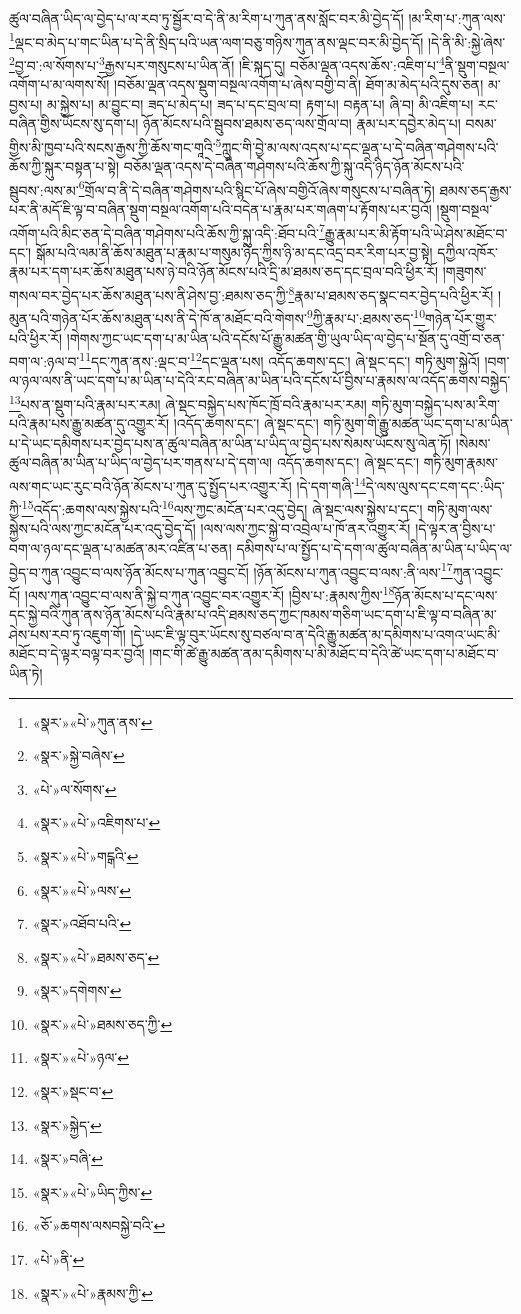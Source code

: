 ཚུལ་བཞིན་ཡིད་ལ་བྱེད་པ་ལ་རབ་ཏུ་སྦྱོར་བ་དེ་ནི་མ་རིག་པ་ཀུན་ནས་སློང་བར་མི་བྱེད་དོ། །མ་རིག་པ་:ཀུན་ལས་\footnote{«སྣར་»«པེ་»ཀུན་ནས་}ལྡང་བ་མེད་པ་གང་ཡིན་པ་དེ་ནི་སྲིད་པའི་ཡན་ལག་བཅུ་གཉིས་ཀུན་ནས་ལྡང་བར་མི་བྱེད་དོ། །དེ་ནི་མི་:སྐྱེ་ཞེས་\footnote{«སྣར་»སྐྱེ་བཞེས་}བྱ་བ་:ལ་སོགས་པ་\footnote{«པེ་»ལ་སོགས་}རྒྱས་པར་གསུངས་པ་ཡིན་ནོ། །ཇི་སྐད་དུ། བཅོམ་ལྡན་འདས་ཆོས་:འཇིག་པ་\footnote{«སྣར་»«པེ་»འཇིགས་པ་}ནི་སྡུག་བསྔལ་འགོག་པ་མ་ལགས་སོ། །བཅོམ་ལྡན་འདས་སྡུག་བསྔལ་འགོག་པ་ཞེས་བགྱི་བ་ནི། ཐོག་མ་མེད་པའི་དུས་ཅན། མ་བྱས་པ། མ་སྐྱེས་པ། མ་བྱུང་བ། ཟད་པ་མེད་པ། ཟད་པ་དང་བྲལ་བ། རྟག་པ། བརྟན་པ། ཞི་བ། མི་འཇིག་པ། རང་བཞིན་གྱིས་ཡོངས་སུ་དག་པ། ཉོན་མོངས་པའི་སྦུབས་ཐམས་ཅད་ལས་གྲོལ་བ། རྣམ་པར་དབྱེར་མེད་པ། བསམ་གྱིས་མི་ཁྱབ་པའི་སངས་རྒྱས་ཀྱི་ཆོས་གང་གཱའི་\footnote{«སྣར་»«པེ་»གངྒའི་}ཀླུང་གི་བྱེ་མ་ལས་འདས་པ་དང་ལྡན་པ་དེ་བཞིན་གཤེགས་པའི་ཆོས་ཀྱི་སྐུར་བསྟན་པ་སྟེ། བཅོམ་ལྡན་འདས་དེ་བཞིན་གཤེགས་པའི་ཆོས་ཀྱི་སྐུ་འདི་ཉིད་ཉོན་མོངས་པའི་སྦུབས་:ལས་མ་\footnote{«སྣར་»«པེ་»ལས་}གྲོལ་བ་ནི་དེ་བཞིན་གཤེགས་པའི་སྙིང་པོ་ཞེས་བགྱིའོ་ཞེས་གསུངས་པ་བཞིན་ཏེ། ཐམས་ཅད་རྒྱས་པར་ནི་མདོ་ཇི་ལྟ་བ་བཞིན་སྡུག་བསྔལ་འགོག་པའི་བདེན་པ་རྣམ་པར་གཞག་པ་རྟོགས་པར་བྱའོ། །སྡུག་བསྔལ་འགོག་པའི་མིང་ཅན་དེ་བཞིན་གཤེགས་པའི་ཆོས་ཀྱི་སྐུ་འདི་:ཐོབ་པའི་\footnote{«སྣར་»འཐོབ་པའི་}རྒྱུ་རྣམ་པར་མི་རྟོག་པའི་ཡེ་ཤེས་མཐོང་བ་དང་། སྒོམ་པའི་ལམ་ནི་ཆོས་མཐུན་པ་རྣམ་པ་གསུམ་ཉིད་ཀྱིས་ཉི་མ་དང་འདྲ་བར་རིག་པར་བྱ་སྟེ། དཀྱིལ་འཁོར་རྣམ་པར་དག་པར་ཆོས་མཐུན་པས་ཉེ་བའི་ཉོན་མོངས་པའི་དྲི་མ་ཐམས་ཅད་དང་བྲལ་བའི་ཕྱིར་རོ། །གཟུགས་གསལ་བར་བྱེད་པར་ཆོས་མཐུན་པས་ནི་ཤེས་བྱ་:ཐམས་ཅད་ཀྱི་\footnote{«སྣར་»«པེ་»ཐམས་ཅད་}རྣམ་པ་ཐམས་ཅད་སྣང་བར་བྱེད་པའི་ཕྱིར་རོ། །མུན་པའི་གཉེན་པོར་ཆོས་མཐུན་པས་ནི་དེ་ཁོ་ན་མཐོང་བའི་གེགས་\footnote{«སྣར་»དགེགས་}ཀྱི་རྣམ་པ་:ཐམས་ཅད་\footnote{«སྣར་»«པེ་»ཐམས་ཅད་ཀྱི་}གཉེན་པོར་གྱུར་པའི་ཕྱིར་རོ། །གེགས་ཀྱང་ཡང་དག་པ་མ་ཡིན་པའི་དངོས་པོ་རྒྱུ་མཚན་གྱི་ཡུལ་ཡིད་ལ་བྱེད་པ་སྔོན་དུ་འགྲོ་བ་ཅན་བག་ལ་:ཉལ་བ་\footnote{«སྣར་»«པེ་»ཉལ་}དང་ཀུན་ནས་:ལྡང་བ་\footnote{«སྣར་»སྡང་བ་}དང་ལྡན་པས། འདོད་ཆགས་དང་། ཞེ་སྡང་དང་། གཏི་མུག་སྐྱེའོ། །བག་ལ་ཉལ་ལས་ནི་ཡང་དག་པ་མ་ཡིན་པ་དེའི་རང་བཞིན་མ་ཡིན་པའི་དངོས་པོ་བྱིས་པ་རྣམས་ལ་འདོད་ཆགས་བསྐྱེད་\footnote{«སྣར་»སྐྱེད་}པས་ན་སྡུག་པའི་རྣམ་པར་རམ། ཞེ་སྡང་བསྐྱེད་པས་ཁོང་ཁྲོ་བའི་རྣམ་པར་རམ། གཏི་མུག་བསྐྱེད་པས་མ་རིག་པའི་རྣམ་པས་རྒྱུ་མཚན་དུ་འགྱུར་རོ། །འདོད་ཆགས་དང་། ཞེ་སྡང་དང་། གཏི་མུག་གི་རྒྱུ་མཚན་ཡང་དག་པ་མ་ཡིན་པ་དེ་ཡང་དམིགས་པར་བྱེད་པས་ན་ཚུལ་བཞིན་མ་ཡིན་པ་ཡིད་ལ་བྱེད་པས་སེམས་ཡོངས་སུ་ལེན་ཏོ། །སེམས་ཚུལ་བཞིན་མ་ཡིན་པ་ཡིད་ལ་བྱེད་པར་གནས་པ་དེ་དག་ལ། འདོད་ཆགས་དང་། ཞེ་སྡང་དང་། གཏི་མུག་རྣམས་ལས་གང་ཡང་རུང་བའི་ཉོན་མོངས་པ་ཀུན་དུ་སྤྱོད་པར་འགྱུར་རོ། །དེ་དག་གཞི་\footnote{«སྣར་»བཞི་}དེ་ལས་ལུས་དང་ངག་དང་:ཡིད་ཀྱི་\footnote{«སྣར་»«པེ་»ཡིད་ཀྱིས་}འདོད་:ཆགས་ལས་སྐྱེས་པའི་\footnote{«ཅོ་»ཆགས་ལསབསྐྱེ་བའི་}ལས་ཀྱང་མངོན་པར་འདུ་བྱེད། ཞེ་སྡང་ལས་སྐྱེས་པ་དང་། གཏི་མུག་ལས་སྐྱེས་པའི་ལས་ཀྱང་མངོན་པར་འདུ་བྱེད་དོ། །ལས་ལས་ཀྱང་སྐྱེ་བ་འབྲེལ་པ་ཁོ་ནར་འགྱུར་རོ། །དེ་ལྟར་ན་བྱིས་པ་བག་ལ་ཉལ་དང་ལྡན་པ་མཚན་མར་འཛིན་པ་ཅན། དམིགས་པ་ལ་སྤྱོད་པ་དེ་དག་ལ་ཚུལ་བཞིན་མ་ཡིན་པ་ཡིད་ལ་བྱེད་བ་ཀུན་འབྱུང་བ་ལས་ཉོན་མོངས་པ་ཀུན་འབྱུང་ངོ། །ཉོན་མོངས་པ་ཀུན་འབྱུང་བ་ལས་:ནི་ལས་\footnote{«པེ་»ནི་}ཀུན་འབྱུང་ངོ། །ལས་ཀུན་འབྱུང་བ་ལས་ནི་སྐྱེ་བ་ཀུན་འབྱུང་བར་འགྱུར་རོ། །བྱིས་པ་:རྣམས་ཀྱིས་\footnote{«སྣར་»«པེ་»རྣམས་ཀྱི་}ཉོན་མོངས་པ་དང་ལས་དང་སྐྱེ་བའི་ཀུན་ནས་ཉོན་མོངས་པའི་རྣམ་པ་འདི་ཐམས་ཅད་ཀྱང་ཁམས་གཅིག་ཡང་དག་པ་ཇི་ལྟ་བ་བཞིན་མ་ཤེས་པས་རབ་ཏུ་འཇུག་གོ། །དེ་ཡང་ཇི་ལྟ་བུར་ཡོངས་སུ་བཙལ་བ་ན་དེའི་རྒྱུ་མཚན་མ་དམིགས་པ་འགའ་ཡང་མི་མཐོང་བ་དེ་ལྟར་བལྟ་བར་བྱའོ། །གང་གི་ཚེ་རྒྱུ་མཚན་ནམ་དམིགས་པ་མི་མཐོང་བ་དེའི་ཚེ་ཡང་དག་པ་མཐོང་བ་ཡིན་ཏེ། 